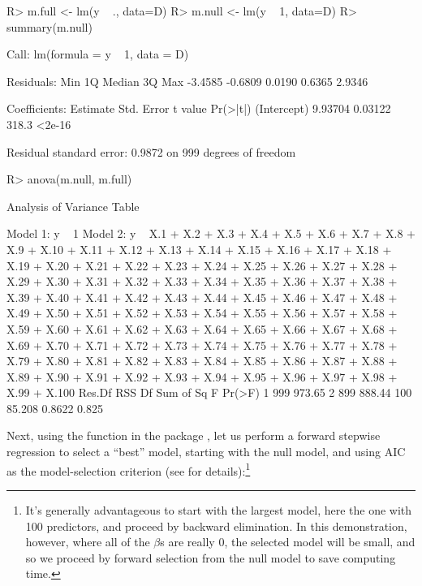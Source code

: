 \documentclass[
]{jss}
\begin{document}
\begin{CodeChunk}
\begin{CodeInput}
R> m.full <- lm(y ~ ., data=D)
R> m.null <- lm(y ~ 1, data=D)
R> summary(m.null)
\end{CodeInput}
\begin{CodeOutput}

Call:
lm(formula = y ~ 1, data = D)

Residuals:
    Min      1Q  Median      3Q     Max 
-3.4585 -0.6809  0.0190  0.6365  2.9346 

Coefficients:
            Estimate Std. Error t value Pr(>|t|)
(Intercept)  9.93704    0.03122   318.3   <2e-16

Residual standard error: 0.9872 on 999 degrees of freedom
\end{CodeOutput}
\begin{CodeInput}
R> anova(m.null, m.full)
\end{CodeInput}
\begin{CodeOutput}
Analysis of Variance Table

Model 1: y ~ 1
Model 2: y ~ X.1 + X.2 + X.3 + X.4 + X.5 + X.6 + X.7 + X.8 + X.9 + X.10 + 
    X.11 + X.12 + X.13 + X.14 + X.15 + X.16 + X.17 + X.18 + X.19 + 
    X.20 + X.21 + X.22 + X.23 + X.24 + X.25 + X.26 + X.27 + X.28 + 
    X.29 + X.30 + X.31 + X.32 + X.33 + X.34 + X.35 + X.36 + X.37 + 
    X.38 + X.39 + X.40 + X.41 + X.42 + X.43 + X.44 + X.45 + X.46 + 
    X.47 + X.48 + X.49 + X.50 + X.51 + X.52 + X.53 + X.54 + X.55 + 
    X.56 + X.57 + X.58 + X.59 + X.60 + X.61 + X.62 + X.63 + X.64 + 
    X.65 + X.66 + X.67 + X.68 + X.69 + X.70 + X.71 + X.72 + X.73 + 
    X.74 + X.75 + X.76 + X.77 + X.78 + X.79 + X.80 + X.81 + X.82 + 
    X.83 + X.84 + X.85 + X.86 + X.87 + X.88 + X.89 + X.90 + X.91 + 
    X.92 + X.93 + X.94 + X.95 + X.96 + X.97 + X.98 + X.99 + X.100
  Res.Df    RSS  Df Sum of Sq      F Pr(>F)
1    999 973.65                            
2    899 888.44 100    85.208 0.8622  0.825
\end{CodeOutput}
\end{CodeChunk}

Next, using the  function in the  package
\citep{VenablesRipley:2002}, let us perform a forward stepwise
regression to select a ``best'' model, starting with the null model, and
using AIC as the model-selection criterion (see  for
details):\footnote{It's generally advantageous to start with the largest
  model, here the one with 100 predictors, and proceed by backward
  elimination. In this demonstration, however, where all of the
  \(\beta\)s are really 0, the selected model will be small, and so we
  proceed by forward selection from the null model to save computing
  time.}
\end{document}
